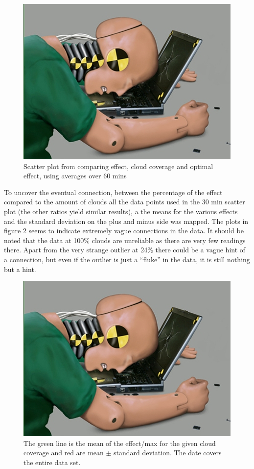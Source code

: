 \begin{figure}
  \centering
  \includegraphics{dummy.jpg}
  \caption{Scatter plot from comparing effect, cloud coverage and
    optimal effect, using averages over 60 mins}
  \label{fig:scatter60}
\end{figure}

To uncover the eventual connection, between the percentage of the
effect compared to the amount of clouds all the data points used in
the 30 min scatter plot (the other ratios yield similar results), a
the means for the various effects and the standard deviation on the
plus and minus side was mapped.  The plots in figure
\ref{fig:stattotal} seems to indicate extremely vague connections in
the data.  It should be noted that the data at 100\% clouds are
unreliable as there are very few readings there.  Apart from the very
strange outlier at 24\% there could be a vague hint of a connection,
but even if the outlier is just a ``fluke'' in the data, it is still
nothing but a hint.

\begin{figure}
  \centering
  \includegraphics{dummy.jpg}
  \caption{The green line is the mean of the effect/max for the given
    cloud coverage and red are mean $\pm$ standard deviation.  The
    date covers the entire data set.}
  \label{fig:stattotal}
\end{figure}

